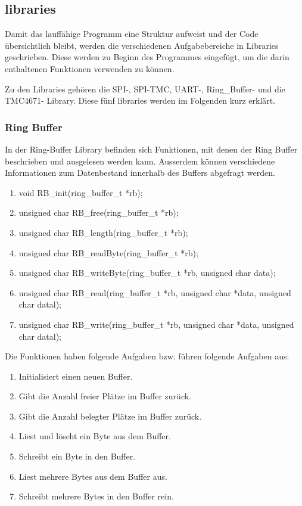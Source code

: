 
\subsection{libraries}\label{subsec:Software_Lib}

Damit das lauffähige Programm eine Struktur aufweist und der Code übersichtlich bleibt, werden die verschiedenen Aufgabebereiche in Libraries geschrieben. Diese werden zu Beginn des Programmes eingefügt, um die darin enthaltenen Funktionen verwenden zu können.

Zu den Libraries gehören die SPI-, SPI-TMC, UART-, Ring\_Buffer- und die TMC4671- Library. Diese fünf libraries werden im Folgenden kurz erklärt.

\subsubsection{Ring Buffer}\label{subsubsec:Software_RingBuffer}

In der Ring-Buffer Library befinden sich Funktionen, mit denen der Ring Buffer beschrieben und ausgelesen werden kann. Ausserdem können verschiedene Informationen zum Datenbestand innerhalb des Buffers abgefragt werden.

\begin{enumerate}
\item void RB\_init(ring\_buffer\_t *rb);
\item unsigned char	RB\_free(ring\_buffer\_t *rb);
\item unsigned char	RB\_length(ring\_buffer\_t *rb);
\item unsigned char	RB\_readByte(ring\_buffer\_t *rb);
\item unsigned char	RB\_writeByte(ring\_buffer\_t *rb, unsigned char data);
\item unsigned char	RB\_read(ring\_buffer\_t *rb, unsigned char *data, unsigned char datal);
\item unsigned char	RB\_write(ring\_buffer\_t *rb, unsigned char *data, unsigned char datal);
\end{enumerate}

Die Funktionen haben folgende Aufgaben bzw. führen folgende Aufgaben aus:

\begin{enumerate}
\item Initialisiert einen neuen Buffer.
\item Gibt die Anzahl freier Plätze im Buffer zurück.
\item Gibt die Anzahl belegter Plätze im Buffer zurück.
\item Liest und löscht ein Byte aus dem Buffer.
\item Schreibt ein Byte in den Buffer.
\item Liest mehrere Bytes aus dem Buffer aus.
\item Schreibt mehrere Bytes in den Buffer rein.
\end{enumerate}

